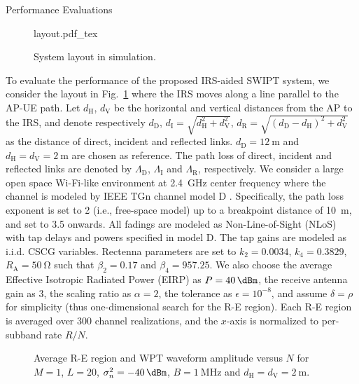 \documentclass[journal]{IEEEtran}
\begin{document}
	\begin{section}{Performance Evaluations}\label{se:performance_evaluation}
		\begin{figure}[!t]
			\centering
			\def\svgwidth{0.9\columnwidth}
			{layout.pdf_tex}
			\caption{System layout in simulation.}
			\label{fi:layout}
		\end{figure}

		To evaluate the performance of the proposed IRS-aided SWIPT system, we consider the layout in Fig.~\ref{fi:layout} where the IRS moves along a line parallel to the AP-UE path. Let $d_{\mathrm{H}}$, $d_{\mathrm{V}}$ be the horizontal and vertical distances from the AP to the IRS, and denote respectively $d_{\mathrm{D}}$, $d_{\mathrm{I}}=\sqrt{d_{\mathrm{H}}^2+d_{\mathrm{V}}^2}$, $d_{\mathrm{R}}=\sqrt{(d_{\mathrm{D}}-d_{\mathrm{H}})^2+d_{\mathrm{V}}^2}$ as the distance of direct, incident and reflected links. $d_{\mathrm{D}}=\SI{12}{\meter}$ and $d_{\mathrm{H}}=d_{\mathrm{V}}=\SI{2}{\meter}$ are chosen as reference. The path loss of direct, incident and reflected links are denoted by $\Lambda_{\mathrm{D}}$, $\Lambda_{\mathrm{I}}$ and $\Lambda_{\mathrm{R}}$, respectively. We consider a large open space Wi-Fi-like environment at \SI{2.4}{\GHz} center frequency where the channel is modeled by IEEE TGn channel model D \cite{Erceg2004}. Specifically, the path loss exponent is set to \num{2} (i.e., free-space model) up to a breakpoint distance of \SI{10}{\meter}, and set to \num{3.5} onwards. All fadings are modeled as Non-Line-of-Sight (NLoS) with tap delays and powers specified in model D. The tap gains are modeled as i.i.d. CSCG variables. Rectenna parameters are set to $k_2=0.0034$, $k_4=0.3829$, $R_{\mathrm{A}}=\SI{50}{\ohm}$ \cite{Clerckx2016a} such that $\beta_2=0.17$ and $\beta_4=957.25$. We also choose the average Effective Isotropic Radiated Power (EIRP) as $P=\SI{40}{\dBm}$, the receive antenna gain as \SI{3}{\dBi}, the scaling ratio as $\alpha=2$, the tolerance as $\epsilon=10^{-8}$, and assume $\delta=\rho$ for simplicity (thus one-dimensional search for the R-E region). Each R-E region is averaged over \num{300} channel realizations, and the $x$-axis is normalized to per-subband rate $R/N$.

		\begin{figure}[!t]
			\centering
			\caption{Average R-E region and WPT waveform amplitude versus $N$ for $M=1$, $L=20$, $\sigma_n^2=\SI{-40}{\dBm}$, $B=\SI{1}{\MHz}$ and $d_{\mathrm{H}}=d_{\mathrm{V}}=\SI{2}{\meter}$.}
		\end{figure}


\end{section}
\end{document}
